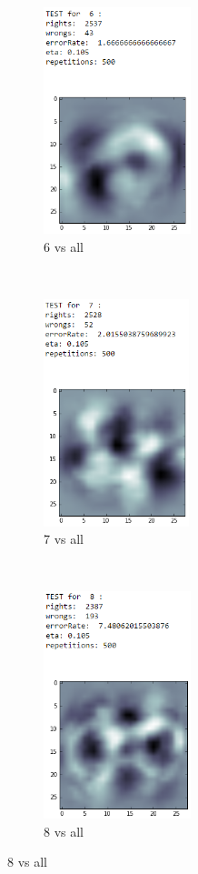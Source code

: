 \documentclass[paper=a4, fontsize=11pt]{scrartcl} %
\numberwithin{equation}{section} %
\numberwithin{figure}{section} %
\numberwithin{table}{section} %
\begin{document}
\begin{figure}
\begin{subfigure}[t]{0.32\textwidth}
		\end{subfigure}
		~
		\begin{subfigure}[t]{0.32\textwidth}
			\centering
			\includegraphics[height=2.6in]{test6}
            \caption*{6 vs all}
		\end{subfigure}%
		~
		\begin{subfigure}[t]{0.32\textwidth}
			\centering
			\includegraphics[height=2.6in]{test7}
            \caption*{7 vs all}
		\end{subfigure}
		~
		\begin{subfigure}[t]{0.32\textwidth}
			\centering
			\includegraphics[height=2.6in]{test8}
            \caption*{8 vs all}
		\end{subfigure}
    \end{figure}
    
\end{document}
